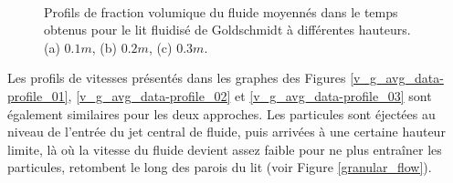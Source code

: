 
\begin{figure}[h!]
\hspace{\fill}
\hspace{\fill}
   \\
\caption{\label{ep_g_avg_data-profile}Profils de fraction volumique du fluide moyennés dans le temps obtenus pour le lit fluidisé de Goldschmidt à différentes hauteurs. (a) $0.1 m$, (b) $0.2 m$, (c) $0.3 m$.}
\end{figure}

Les profils de vitesses présentés dans les graphes des Figures \ref{v_g_avg_data-profile_01}, \ref{v_g_avg_data-profile_02} et \ref{v_g_avg_data-profile_03} sont également similaires pour les deux approches. Les particules sont éjectées au niveau de l'entrée du jet central de fluide, puis arrivées à une certaine hauteur limite, là où la vitesse du fluide devient assez faible pour ne plus entraîner les particules, retombent le long des parois du lit (voir Figure \ref{granular_flow}).

